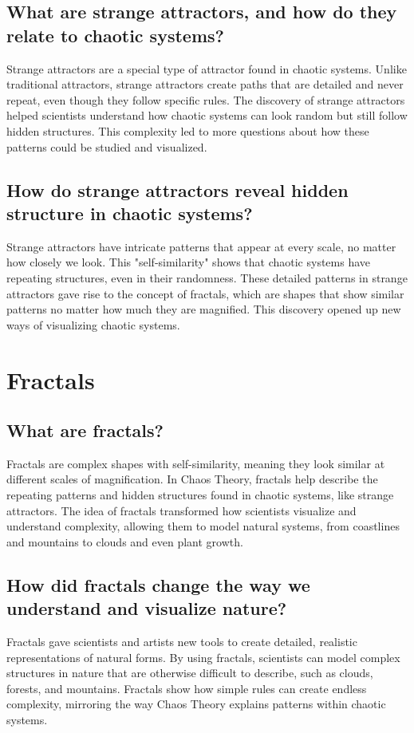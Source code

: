 \documentclass[12pt]{article}
\begin{document}
\subsection{What are strange attractors, and how do they relate to chaotic systems?}
Strange attractors are a special type of attractor found in chaotic systems. Unlike traditional attractors, strange attractors create paths that are detailed and never repeat, even though they follow specific rules. The discovery of strange attractors helped scientists understand how chaotic systems can look random but still follow hidden structures. This complexity led to more questions about how these patterns could be studied and visualized.

\subsection{How do strange attractors reveal hidden structure in chaotic systems?}
Strange attractors have intricate patterns that appear at every scale, no matter how closely we look. This "self-similarity" shows that chaotic systems have repeating structures, even in their randomness. These detailed patterns in strange attractors gave rise to the concept of fractals, which are shapes that show similar patterns no matter how much they are magnified. This discovery opened up new ways of visualizing chaotic systems.

\section{Fractals}
\subsection{What are fractals?}
Fractals are complex shapes with self-similarity, meaning they look similar at different scales of magnification. In Chaos Theory, fractals help describe the repeating patterns and hidden structures found in chaotic systems, like strange attractors. The idea of fractals transformed how scientists visualize and understand complexity, allowing them to model natural systems, from coastlines and mountains to clouds and even plant growth.

\subsection{How did fractals change the way we understand and visualize nature?}
Fractals gave scientists and artists new tools to create detailed, realistic representations of natural forms. By using fractals, scientists can model complex structures in nature that are otherwise difficult to describe, such as clouds, forests, and mountains. Fractals show how simple rules can create endless complexity, mirroring the way Chaos Theory explains patterns within chaotic systems.
\end{document}
